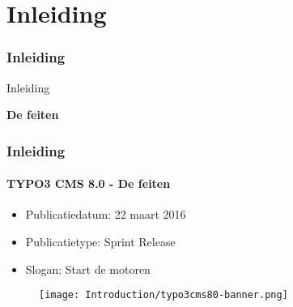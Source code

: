 %

\section{Inleiding}
\begin{frame}[fragile]
	\frametitle{Inleiding}

	\begin{center}\huge{Inleiding}\end{center}
	\begin{center}\huge{\color{typo3darkgrey}\textbf{De feiten}}\end{center}

\end{frame}

\begin{frame}[fragile]
	\frametitle{Inleiding}
	\framesubtitle{TYPO3 CMS 8.0 - De feiten}

	\begin{itemize}
		\item Publicatiedatum: 22 maart 2016
		\item Publicatietype: Sprint Release
		\item Slogan: Start de motoren
	\end{itemize}

	\begin{figure}
		\texttt{[image: Introduction/typo3cms80-banner.png]}
	\end{figure}

\end{frame}

